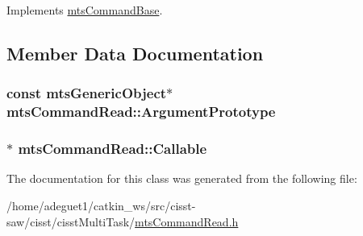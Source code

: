Implements \hyperlink{classmts_command_base_a0885ce7a5321d7b672694ade780b9d64}{mts\-Command\-Base}.



\subsection{Member Data Documentation}
\hypertarget{classmts_command_read_ab99241122421dce8a29351f19b97e8c0}{
\subsubsection[{Argument\-Prototype}]{\setlength{\rightskip}{0pt plus 5cm}const {\bf mts\-Generic\-Object}$\ast$ mts\-Command\-Read\-::\-Argument\-Prototype\hspace{0.3cm}{\ttfamily [protected]}}}\label{classmts_command_read_ab99241122421dce8a29351f19b97e8c0}
\hypertarget{classmts_command_read_aa99a8b6be2493dfffc746078347ae0c8}{
\subsubsection[{Callable}]{$\ast$ mts\-Command\-Read\-::\-Callable\hspace{0.3cm}{\ttfamily [protected]}}}\label{classmts_command_read_aa99a8b6be2493dfffc746078347ae0c8}


The documentation for this class was generated from the following file\-:\begin{DoxyCompactItemize}
\item 
/home/adeguet1/catkin\-\_\-ws/src/cisst-\/saw/cisst/cisst\-Multi\-Task/\hyperlink{mts_command_read_8h}{mts\-Command\-Read.\-h}\end{DoxyCompactItemize}
